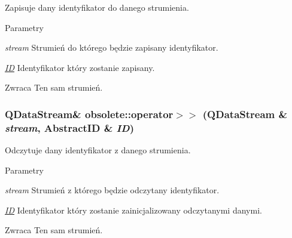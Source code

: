 Zapisuje dany identyfikator do danego strumienia. 


\begin{DoxyParams}{Parametry}
\item[{\em stream}]Strumień do którego będzie zapisany identyfikator. \item[{\em \hyperlink{classobsolete_1_1ID}{ID}}]Identyfikator który zostanie zapisany. \end{DoxyParams}
\begin{DoxyReturn}{Zwraca}
Ten sam strumień. 
\end{DoxyReturn}
\hypertarget{namespaceobsolete_aa4c713ba2a42ffbb45bbeca0e2800a76}{
\subsubsection[{operator$>$$>$}]{\setlength{\rightskip}{0pt plus 5cm}QDataStream\& obsolete::operator$>$$>$ (QDataStream \& {\em stream}, \/  AbstractID \& {\em ID})}}
\label{namespaceobsolete_aa4c713ba2a42ffbb45bbeca0e2800a76}


Odczytuje dany identyfikator z danego strumienia. 


\begin{DoxyParams}{Parametry}
\item[{\em stream}]Strumień z którego będzie odczytany identyfikator. \item[{\em \hyperlink{classobsolete_1_1ID}{ID}}]Identyfikator który zostanie zainicjalizowany odczytanymi danymi. \end{DoxyParams}
\begin{DoxyReturn}{Zwraca}
Ten sam strumień. 
\end{DoxyReturn}
